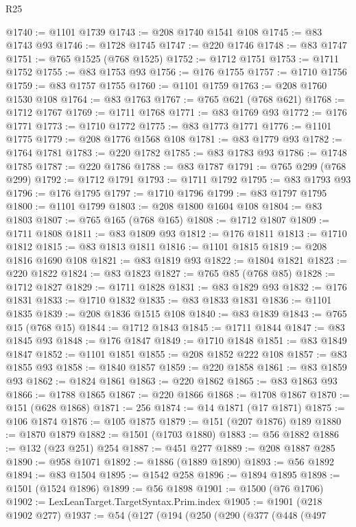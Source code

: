 \begin{lexlean}{R25}
\begin{coremodule}
@1740 := @1101 @1739
@1743 := @208 @1740 @1541 @108
@1745 := @83 @1743 @93
@1746 := @1728 @1745
@1747 := @220 @1746
@1748 := @83 @1747
@1751 := @765 @1525 (@768 @1525)
@1752 := @1712 @1751
@1753 := @1711 @1752
@1755 := @83 @1753 @93
@1756 := @176 @1755
@1757 := @1710 @1756
@1759 := @83 @1757 @1755
@1760 := @1101 @1759
@1763 := @208 @1760 @1530 @108
@1764 := @83 @1763
@1767 := @765 @621 (@768 @621)
@1768 := @1712 @1767
@1769 := @1711 @1768
@1771 := @83 @1769 @93
@1772 := @176 @1771
@1773 := @1710 @1772
@1775 := @83 @1773 @1771
@1776 := @1101 @1775
@1779 := @208 @1776 @1568 @108
@1781 := @83 @1779 @93
@1782 := @1764 @1781
@1783 := @220 @1782
@1785 := @83 @1783 @93
@1786 := @1748 @1785
@1787 := @220 @1786
@1788 := @83 @1787
@1791 := @765 @299 (@768 @299)
@1792 := @1712 @1791
@1793 := @1711 @1792
@1795 := @83 @1793 @93
@1796 := @176 @1795
@1797 := @1710 @1796
@1799 := @83 @1797 @1795
@1800 := @1101 @1799
@1803 := @208 @1800 @1604 @108
@1804 := @83 @1803
@1807 := @765 @165 (@768 @165)
@1808 := @1712 @1807
@1809 := @1711 @1808
@1811 := @83 @1809 @93
@1812 := @176 @1811
@1813 := @1710 @1812
@1815 := @83 @1813 @1811
@1816 := @1101 @1815
@1819 := @208 @1816 @1690 @108
@1821 := @83 @1819 @93
@1822 := @1804 @1821
@1823 := @220 @1822
@1824 := @83 @1823
@1827 := @765 @85 (@768 @85)
@1828 := @1712 @1827
@1829 := @1711 @1828
@1831 := @83 @1829 @93
@1832 := @176 @1831
@1833 := @1710 @1832
@1835 := @83 @1833 @1831
@1836 := @1101 @1835
@1839 := @208 @1836 @1515 @108
@1840 := @83 @1839
@1843 := @765 @15 (@768 @15)
@1844 := @1712 @1843
@1845 := @1711 @1844
@1847 := @83 @1845 @93
@1848 := @176 @1847
@1849 := @1710 @1848
@1851 := @83 @1849 @1847
@1852 := @1101 @1851
@1855 := @208 @1852 @222 @108
@1857 := @83 @1855 @93
@1858 := @1840 @1857
@1859 := @220 @1858
@1861 := @83 @1859 @93
@1862 := @1824 @1861
@1863 := @220 @1862
@1865 := @83 @1863 @93
@1866 := @1788 @1865
@1867 := @220 @1866
@1868 := @1708 @1867
@1870 := @151 (@628 @1868)
@1871 := 256
@1874 := @14 @1871 (@17 @1871)
@1875 := @106 @1874
@1876 := @105 @1875
@1879 := @151 (@207 @1876) @189
@1880 := @1870 @1879
@1882 := @1501 (@1703 @1880)
@1883 := @56 @1882
@1886 := @132 (@23 @251) @254
@1887 := @451 @277
@1889 := @208 @1887 @285
@1890 := @958 @1071
@1892 := @1886 (@1889 @1890)
@1893 := @56 @1892
@1894 := @83 @1504
@1895 := @1542 @258
@1896 := @1894 @1895
@1898 := @1501 (@1524 @1896)
@1899 := @56 @1898
@1901 := @1500 (@76 @1706)
@1902 := LexLeanTarget.TargetSyntax.Prim.index
@1905 := @1901 (@218 @1902 @277)
@1937 := @54
    (@127
      (@194
        (@250
          (@290
            (@377
              (@448
                (@497

\end{coremodule}
\end{lexlean}
